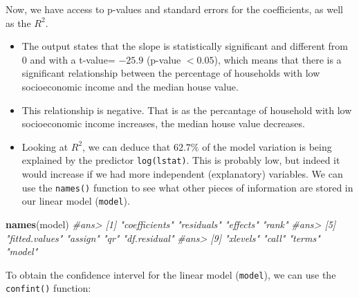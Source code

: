 \documentclass[]{book}
\newenvironment{Shaded}{\begin{snugshade}}{\end{snugshade}}
\newcommand{\KeywordTok}[1]{\textcolor[rgb]{0.13,0.29,0.53}{\textbf{{#1}}}}
\newcommand{\DataTypeTok}[1]{\textcolor[rgb]{0.13,0.29,0.53}{{#1}}}
\newcommand{\FloatTok}[1]{\textcolor[rgb]{0.00,0.00,0.81}{{#1}}}
\newcommand{\CommentTok}[1]{\textcolor[rgb]{0.56,0.35,0.01}{\textit{{#1}}}}
\newcommand{\NormalTok}[1]{{#1}}
\providecommand{\tightlist}{%
  \setlength{\itemsep}{0pt}\setlength{\parskip}{0pt}}
\begin{document}
Now, we have access to p-values and standard errors for the
coefficients, as well as the \(R^2\).

\begin{itemize}
\tightlist
\item
  The output states that the slope is statistically significant and
  different from \(0\) and with a t-value= \(-25.9\) (p-value
  \(< 0.05\)), which means that there is a significant relationship
  between the percentage of households with low socioeconomic income and
  the median house value.
\item
  This relationship is negative. That is as the percantage of household
  with low socioeconomic income increases, the median house value
  decreases.
\item
  Looking at \(R^2\), we can deduce that \(62.7\%\) of the model
  variation is being explained by the predictor \texttt{log(lstat)}.
  This is probably low, but indeed it would increase if we had more
  independent (explanatory) variables. We can use the \texttt{names()}
  function to see what other pieces of information are stored in our
  linear model (\texttt{model}).
\end{itemize}

\begin{Shaded}
\begin{Highlighting}[]
\KeywordTok{names}\NormalTok{(model)}
\CommentTok{#ans>  [1] "coefficients"  "residuals"     "effects"       "rank"         }
\CommentTok{#ans>  [5] "fitted.values" "assign"        "qr"            "df.residual"  }
\CommentTok{#ans>  [9] "xlevels"       "call"          "terms"         "model"}
\end{Highlighting}
\end{Shaded}

\begin{Shaded}
\end{Shaded}

To obtain the confidence intervel for the linear model (\texttt{model}),
we can use the \texttt{confint()} function:

\begin{Shaded}
\end{Shaded}
\end{document}
